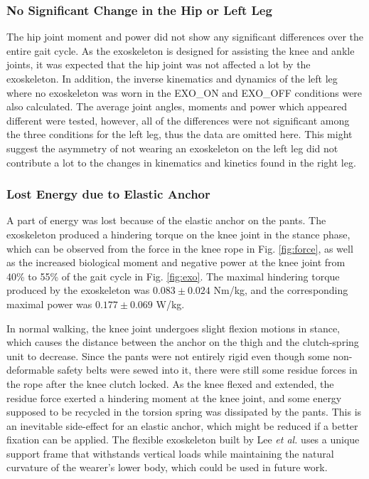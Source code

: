\documentclass[twocolumn,cleanfoot,10pt]{asme2ej}
\begin{document}
\subsubsection{No Significant Change in the Hip or Left Leg}
The hip joint moment and power did not show any significant differences over the entire gait cycle.
As the exoskeleton is designed for assisting the knee and ankle joints, it was expected that the hip joint was not affected a lot by the exoskeleton.
In addition, the inverse kinematics and dynamics of the left leg where no exoskeleton was worn in the EXO\_ON and EXO\_OFF conditions were also calculated.
The average joint angles, moments and power which appeared different were tested, however, all of the differences were not significant among the three conditions for the left leg, thus the data are omitted here.
This might suggest the asymmetry of not wearing an exoskeleton on the left leg did not contribute a lot to the changes in kinematics and kinetics found in the right leg.

\subsubsection{Lost Energy due to Elastic Anchor}
A part of energy was lost because of the elastic anchor on the pants.
The exoskeleton produced a hindering torque on the knee joint in the stance phase, which can be observed from the force in the knee rope in Fig. \ref{fig:force}, as well as the increased biological moment and negative power at the knee joint from 40\% to 55\% of the gait cycle in Fig. \ref{fig:exo}. 
The maximal hindering torque produced by the exoskeleton was $0.083\pm0.024$ Nm/kg, and the corresponding maximal power was $0.177\pm0.069$ W/kg.

In normal walking, the knee joint undergoes slight flexion motions in stance, which causes the distance between the anchor on the thigh and the clutch-spring unit to decrease.
Since the pants were not entirely rigid even though some non-deformable safety belts were sewed into it, there were still some residue forces in the rope after the knee clutch locked.
As the knee flexed and extended, the residue force exerted a hindering moment at the knee joint, and some energy supposed to be recycled in the torsion spring was dissipated by the pants.
This is an inevitable side-effect for an elastic anchor, which might be reduced if a better fixation can be applied.
The flexible exoskeleton built by Lee \emph{et al.} \cite{exosuit} uses a unique support frame that withstands vertical loads while maintaining the natural curvature of the wearer's lower body, which could be used in future work.
\end{document}
